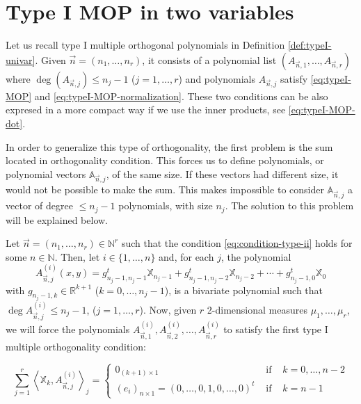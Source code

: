 \documentclass[12pt,a4]{report}
\theoremstyle{plain}
\newcommand{\R}[0]{\mathbb{R}}
\newcommand{\N}[0]{\mathbb{N}}
\newcommand{\prodesc}[2]{\left\langle #1 , #2 \right\rangle}
\begin{document}
\section{Type I MOP in two variables}

Let us recall type I multiple orthogonal polynomials in Definition \ref{def:typeI-univar}. Given $\vec n =(n_1,\dots,n_r)$, it consists of a polynomial list $(A_{\vec n,1},\dots,A_{\vec n, r})$ where $\deg(A_{\vec n,j})\leq n_j-1$ ($j=1,\dots,r$) and polynomials $A_{\vec n,j}$ satisfy \eqref{eq:typeI-MOP} and \eqref{eq:typeI-MOP-normalization}. These two conditions can be also expresed in a more compact way if we use the inner products, see \eqref{eq:typeI-MOP-dot}.

In order to generalize this type of orthogonality, the first problem is the sum located in orthogonality condition. This forces us to define polynomials, or polynomial vectors $\mathbb A_{\vec n, j}$, of the same size. If these vectors had different size, it would not be possible to make the sum. This makes impossible to consider $\mathbb A_{\vec n,j}$ a vector of degree $\leq n_j-1$ polynomials, with size $n_j$. The solution to this problem will be explained below.

Let $\vec n = (n_1,\dots,n_r)\in\N^r$ such that the condition \eqref{eq:condition-type-ii} holds for some $n\in\N$. Then, let $i\in\{1,\dots,n\}$ and, for each $j$, the polynomial $$A_{\vec n, j}^{(i)}(x,y) = g_{n_j-1,n_j-1}^t \mathbb X_{n_j-1} + g_{n_j-1,n_j-2}^t \mathbb X_{n_j-2} + \cdots + g_{n_j-1,0}^t \mathbb X_{0}$$ with $g_{n_j-1,k}\in\R^{k+1}$ ($k=0,\dots,n_j-1$), is a bivariate polynomial such that $\deg A_{\vec n, j}^{(i)} \leq n_j-1$, ($j=1,\dots,r$). Now, given $r$ 2-dimensional measures $\mu_1,\dots,\mu_r$, we will force the polynomials $A_{\vec n, 1}^{(i)}, A_{\vec n, 2}^{(i)}, \dots, A_{\vec n, r}^{(i)}$ to satisfy the first type I multiple orthogonality condition:

\begin{equation}
    \label{eq:first-condition-type-I}
    \sum_{j=1}^r \prodesc{\mathbb X_k}{A_{\vec n,j}^{(i)}}_j = \left\{\begin{array}{ccl}
        0_{(k+1)\times 1} &   \text{ if } & k=0,\dots,n-2 \\
        (e_i)_{n\times 1} = (0,\dots,0,1,0,\dots,0)^t & \text{ if } & k=n-1      
    \end{array}\right.
\end{equation}
\end{document}
